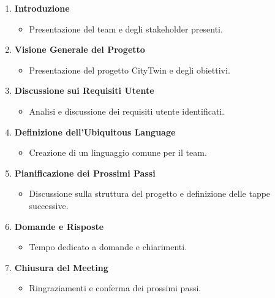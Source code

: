 \begin{enumerate}
    \item \textbf{Introduzione}
          \begin{itemize}
              \item Presentazione del team e degli stakeholder presenti.
          \end{itemize}

    \item \textbf{Visione Generale del Progetto}
          \begin{itemize}
              \item Presentazione del progetto CityTwin e degli obiettivi.
          \end{itemize}

    \item \textbf{Discussione sui Requisiti Utente}
          \begin{itemize}
              \item Analisi e discussione dei requisiti utente identificati.
          \end{itemize}

    \item \textbf{Definizione dell'Ubiquitous Language}
          \begin{itemize}
              \item Creazione di un linguaggio comune per il team.
          \end{itemize}

    \item \textbf{Pianificazione dei Prossimi Passi}
          \begin{itemize}
              \item Discussione sulla struttura del progetto e definizione delle tappe successive.
          \end{itemize}

    \item \textbf{Domande e Risposte}
          \begin{itemize}
              \item Tempo dedicato a domande e chiarimenti.
          \end{itemize}

    \item \textbf{Chiusura del Meeting}
          \begin{itemize}
              \item Ringraziamenti e conferma dei prossimi passi.
          \end{itemize}
\end{enumerate}

